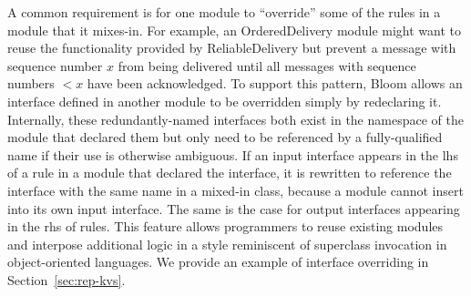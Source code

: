 A common requirement is for one module to ``override'' some of the rules in a
module that it mixes-in. For example, an OrderedDelivery module might want to
reuse the functionality provided by ReliableDelivery but prevent a message with
sequence number $x$ from being delivered until all messages with sequence
numbers $<x$ have been acknowledged. To support this pattern, Bloom allows an
interface defined in another module to be overridden simply by redeclaring
it. Internally, these redundantly-named interfaces both exist in the namespace of the
module that declared them but only need to be referenced by a fully-qualified
name if their use is otherwise ambiguous.  If an input interface appears in the
lhs of a rule in a module that declared the interface, it is rewritten to
reference the interface with the same name in a mixed-in class, because a module
cannot insert into its own input interface. The same is the case for output
interfaces appearing in the rhs of rules.  This feature allows programmers to
reuse existing modules and interpose additional logic in a style reminiscent of
superclass invocation in object-oriented languages.  We provide an example of
interface overriding in Section~\ref{sec:rep-kvs}.


